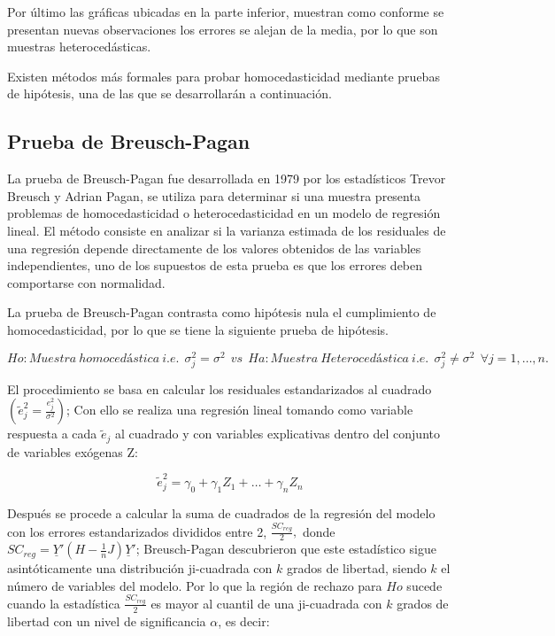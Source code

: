 \documentclass[a4paper,oneside,openany]{book}
\begin{document}
Por último las gráficas ubicadas en la parte inferior, muestran como
conforme se presentan nuevas observaciones los errores se alejan de la
media, por lo que son muestras heterocedásticas.

Existen métodos más formales para probar homocedasticidad mediante
pruebas de hipótesis, una de las que se desarrollarán a continuación.

\subsection{Prueba de Breusch-Pagan}\label{prueba-de-breusch-pagan}

La prueba de Breusch-Pagan fue desarrollada en 1979 por los estadísticos
Trevor Breusch y Adrian Pagan, se utiliza para determinar si una muestra
presenta problemas de homocedasticidad o heterocedasticidad en un modelo
de regresión lineal. El método consiste en analizar si la varianza
estimada de los residuales de una regresión depende directamente de los
valores obtenidos de las variables independientes, uno de los supuestos
de esta prueba es que los errores deben comportarse con normalidad.

La prueba de Breusch-Pagan contrasta como hipótesis nula el cumplimiento
de homocedasticidad, por lo que se tiene la siguiente prueba de
hipótesis.

\[Ho: Muestra \  homocedástica \ i.e.\ \  \sigma^2_{j}=\sigma^2 \ \ vs \ \
Ha: Muestra \ Heterocedástica \ i.e. \ \ \sigma^2_{j} \neq \sigma^2  \ \ \forall j = 1,\ldots,n.\]

El procedimiento se basa en calcular los residuales estandarizados al
cuadrado \(\left( \tilde{e}^2_{j}=\frac{e^2_{j}}{\sigma^2}\right)\); Con
ello se realiza una regresión lineal tomando como variable respuesta a
cada \(\tilde{e}_{j}\) al cuadrado y con variables explicativas dentro
del conjunto de variables exógenas Z:

\[\tilde{e}_{j}^{2}=\gamma_{0}+\gamma_{1}Z_{1}+ \ldots + \gamma_{n}Z_{n}\]

Después se procede a calcular la suma de cuadrados de la regresión del
modelo con los errores estandarizados divididos entre 2,
\(\frac{SC_{reg}}{2},\) donde
\(SC_{reg}=\underline{Y}'(H-\frac{1}{n}J)\underline{Y}'\); Breusch-Pagan
descubrieron que este estadístico sigue asintóticamente una distribución
ji-cuadrada con \(k\) grados de libertad, siendo \(k\) el número de
variables del modelo. Por lo que la región de rechazo para \(Ho\) sucede
cuando la estadística \(\frac{SC_{reg}}{2}\) es mayor al cuantil de una
ji-cuadrada con \(k\) grados de libertad con un nivel de significancia
\(\alpha\), es decir:
\end{document}
